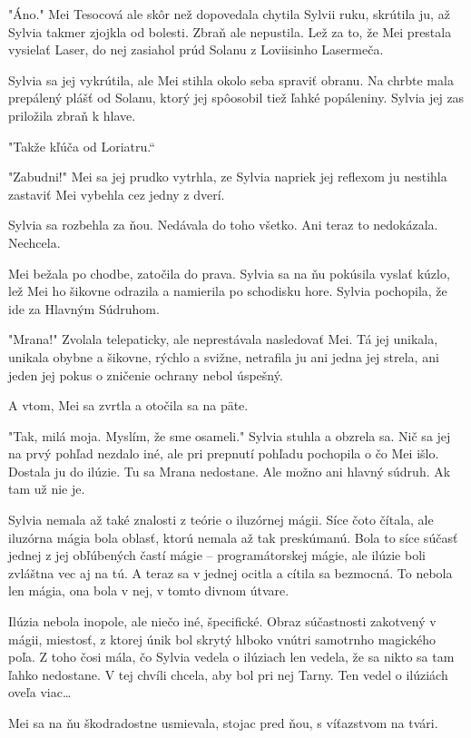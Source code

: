 \documentclass{book}
\begin{document}
"$ $Áno."$ $ Mei Tesocová ale skôr než dopovedala chytila Sylvii ruku, skrútila ju, až Sylvia takmer zjojkla od bolesti. Zbraň ale nepustila. Lež za to, že Mei prestala vysielať Laser, do nej zasiahol prúd Solanu z Loviisinho Lasermeča.

Sylvia sa jej vykrútila, ale Mei stihla okolo seba spraviť obranu. Na chrbte mala prepálený plášť od Solanu, ktorý jej spôosobil tiež ľahké popáleniny. Sylvia jej zas priložila zbraň k hlave.

"$ $Takže kľúča od Loriatru.“

"$ $Zabudni!"$ $ Mei sa jej prudko vytrhla, ze Sylvia napriek jej reflexom ju nestihla zastaviť  Mei vybehla cez jedny z dverí.

Sylvia sa rozbehla za ňou. Nedávala do toho všetko. Ani teraz to nedokázala. Nechcela.

Mei bežala po chodbe, zatočila do prava. Sylvia sa na ňu pokúsila vyslať kúzlo, lež Mei ho šikovne odrazila a namierila po schodisku hore. Sylvia pochopila, že ide za Hlavným Súdruhom.

"$ $Mrana!"$ $ Zvolala telepaticky, ale neprestávala nasledovať Mei. Tá jej unikala, unikala obybne a šikovne, rýchlo a svižne, netrafila ju ani jedna jej strela, ani jeden jej pokus o zničenie ochrany nebol úspešný.

A vtom, Mei sa zvrtla a otočila sa na päte.

"$ $Tak, milá moja. Myslím, že sme osameli."$ $ Sylvia stuhla a obzrela sa. Nič sa jej na prvý pohľad nezdalo iné, ale pri prepnutí pohľadu pochopila o čo Mei išlo. Dostala ju do ilúzie. Tu sa Mrana nedostane. Ale možno ani hlavný súdruh. Ak tam už nie je.

Sylvia nemala až také znalosti z teórie o iluzórnej mágii. Síce čoto čítala, ale iluzórna mágia bola oblasť, ktorú nemala až tak preskúmanú. Bola to síce súčasť jednej z jej obľúbených častí mágie – programátorskej mágie, ale ilúzie boli zvláštna vec aj na tú. A teraz sa v jednej ocitla a cítila sa bezmocná. To nebola len mágia, ona bola v nej, v tomto divnom útvare.

Ilúzia nebola inopole, ale niečo iné, špecifické. Obraz súčastnosti zakotvený v mágii, miestosť, z ktorej únik bol skrytý hlboko vnútri samotrnho magického poľa. Z toho čosi mála, čo Sylvia vedela o ilúziach len vedela, že sa nikto sa tam ľahko nedostane. V tej chvíli chcela, aby bol pri nej Tarny. Ten vedel o ilúziách oveľa viac…

Mei sa na ňu škodradostne usmievala, stojac pred ňou, s víťazstvom na tvári.
\end{document}
